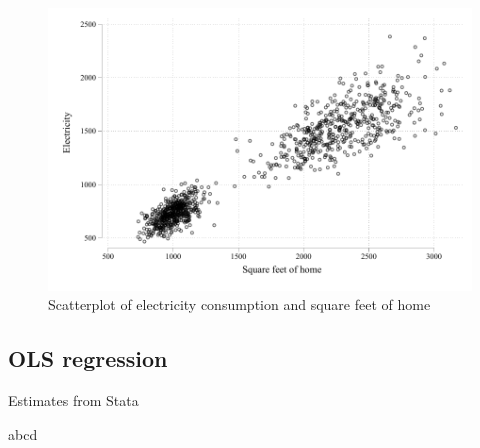 \documentclass{article}
\newcommand{\bib}{references.bib}
\begin{document}
\begin{figure}[H]
    \centering
    \includegraphics[scale = 1]{./figure/twoway.pdf}
    \caption{Scatterplot of electricity consumption and square feet of home}
    \label{f2:twoway}
\end{figure}

\subsection{OLS regression}

\begin{table}[H]\centering
\begin{threeparttable}
    \caption{Estimates from Stata}
    \label{t5:ols_satat}
    
    \begin{tablenotes}
    \small \item abcd
    \end{tablenotes}
\end{threeparttable}
\end{table}

\cite{zm2009}


\end{document}
